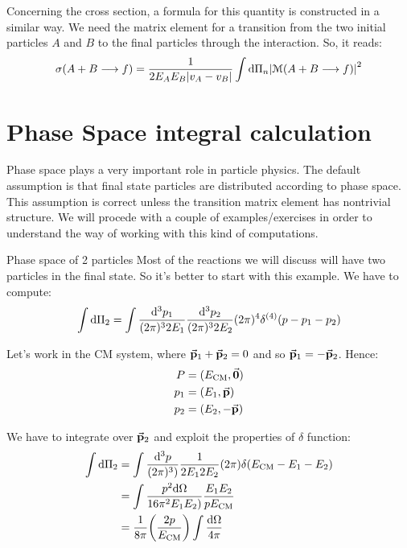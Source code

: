 \documentclass[../../main/main.tex]{subfiles}
\begin{document}
Concerning the cross section, a formula for this quantity is constructed in a similar way. We need the matrix element for a transition from the two initial particles \( A \) and \( B \) to the final particles through the interaction. So, it reads:
\begin{equation}
    \sigma(A + B \longrightarrow f)
    =
    \frac{1}{2 E_A E_B \abs{v_A - v_B}} \int \mathrm{d}{\Pi_n} \abs{\mathcal{M}(A + B \longrightarrow f)}^2
    \label{eq:L03_FGRCS}
\end{equation}





\section{Phase Space integral calculation}
Phase space plays a very important role in particle physics. The default assumption is that final state particles are distributed according to phase space. This assumption is correct unless the transition matrix element has nontrivial structure.
We will procede with a couple of examples/exercises in order to understand the way of working with this kind of computations.

\medskip
\begin{example}{Phase space of 2 particles}{}
	Most of the reactions we will discuss will have two particles in the final state. So it's better to start with this example. We have to compute:
    \begin{equation}
        \int \mathrm{d}{\Pi_2}
        =
        \int \frac{\mathrm{d}{^3 p_1}}{(2\pi)^3 2 E_1} \frac{\mathrm{d}{^3 p_2}}{(2\pi)^3 2 E_2} (2\pi)^4 \delta^{(4)} \qty(p - p_1 - p_2 )
        \label{eq:L03_2PPSE}
    \end{equation}

    Let's work in the CM system, where \( \va{p}_1 + \va{p}_2 = 0 \) and so \( \va{p}_1 = - \va{p}_2 \). Hence:
	\begin{subequations}
		\begin{align}
			P	&= (E_\mathrm{CM}, \va{0}) \\
			p_1	&= (E_1, \va{p}) \\
			p_2	&= (E_2, -\va{p})
		\end{align}
		\label{eq:L03_2PPSD}
	\end{subequations}

	We have to integrate over \( \va{p}_2 \) and exploit the properties of \( \delta \) function:
    \begin{align}
        \int \mathrm{d}{\Pi_2}
        &=
		\int \frac{\mathrm{d}{^3 p}}{(2\pi)^3)} \frac{1}{2 E_1 2 E_2} (2\pi) \delta(E_\mathrm{CM} - E_1 - E_2) \nonumber \\
		&=
        \int \frac{p^2 \mathrm{d}{\Omega}}{16 \pi^2 E_1 E_2)} \frac{E_1 E_2}{p E_\mathrm{CM}} \nonumber \\
		&=
		\frac{1}{8\pi} \qty(\frac{2p}{E_\mathrm{CM}}) \int \frac{\mathrm{d}{\Omega}}{4\pi}
        \label{eq:L03_2PPSI}
    \end{align}
\end{example}
\end{document}
